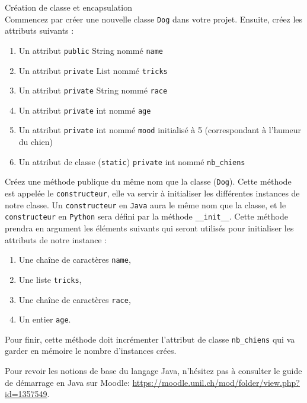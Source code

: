 \begin{Exercice}[10 minutes] Création de classe et encapsulation\\
    Commencez par créer une nouvelle classe \lstinline{Dog} dans votre projet. Ensuite, créez les attributs suivants :
    \begin{enumerate}
    \item Un attribut \lstinline{public} String nommé \lstinline{name}
    \item Un attribut \lstinline{private} List nommé \lstinline{tricks}
    \item Un attribut \lstinline{private} String nommé \lstinline{race}
    \item Un attribut \lstinline{private} int nommé \lstinline{age}
    \item Un attribut \lstinline{private} int nommé \lstinline{mood} initialisé à 5 (correspondant à l'humeur du chien)
    \item Un attribut de classe (\lstinline{static}) \lstinline{private} int nommé \lstinline{nb_chiens}
   	\end{enumerate}
   	
   	Créez une méthode publique du même nom que la classe (\lstinline{Dog}). Cette méthode est appelée le \lstinline{constructeur}, elle va servir à initialiser les différentes instances de notre classe. Un \lstinline{constructeur} en \lstinline{Java} aura le même nom que la classe, et le \lstinline{constructeur} en \lstinline{Python} sera défini par la méthode \lstinline{__init__}. Cette méthode prendra en argument les éléments suivants qui seront utilisés pour initialiser les attributs de notre instance :
   	\begin{enumerate}
    \item Une chaîne de caractères \lstinline{name},
    \item Une liste \lstinline{tricks},
    \item Une chaîne de caractères \lstinline{race},
    \item Un entier \lstinline{age}.
   	\end{enumerate}
   	
   	Pour finir, cette méthode doit incrémenter l'attribut de classe \lstinline{nb_chiens} qui va garder en mémoire le nombre d'instances crées.
   	
\begin{conseil}
    Pour revoir les notions de base du langage Java, n'hésitez pas à consulter le guide de démarrage en Java sur Moodle:
	\url{https://moodle.unil.ch/mod/folder/view.php?id=1357549}.


\end{conseil}
\end{Exercice}
